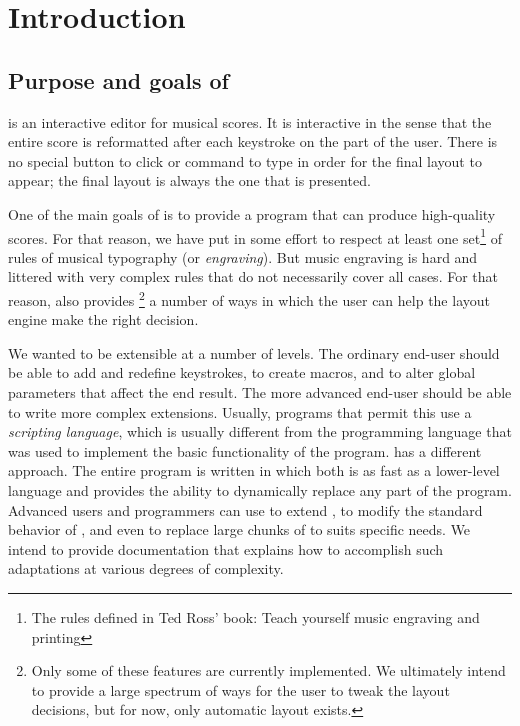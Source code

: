 \chapter{Introduction}
\setcounter{page}{1}

\section{Purpose and goals of \sysname{}}

\sysname{} is an interactive editor for musical scores.  It is interactive
in the sense that the entire score is reformatted after each keystroke
on the part of the user.  There is no special button to click or
command to type in order for the final layout to appear; the final
layout is always the one that is presented. 

One of the main goals of \sysname{} is to provide a program that can
produce high-quality scores.  For that reason, we have put in some
effort to respect at least one set\footnote{The rules defined in Ted
Ross' book: Teach yourself music engraving and printing} of rules of
musical typography (or \emph{engraving}).  But music
engraving is hard and littered with very complex rules that do not
necessarily cover all cases.  For that reason, \sysname{} also provides
\footnote{Only some of these features are currently implemented.  We
ultimately intend to provide a large spectrum of ways for the user to
tweak the layout decisions, but for now, only automatic layout
exists.} a number of ways in which the user can help the layout engine
make the right decision.

We wanted \sysname{} to be extensible at a number of levels.  The ordinary
end-user should be able to add and redefine keystrokes, to create
macros, and to alter global parameters that affect the end result.
The more advanced end-user should be able to write more complex
extensions.  Usually, programs that permit this use a \emph{scripting
language}, which is usually different from the programming language
that was used to implement the basic functionality of the program.
\sysname{} has a different approach.  The entire program is written in
{\commonlisp} which both is as fast as a lower-level language and
provides the ability to dynamically replace any part of the program.
Advanced users and programmers can use {\commonlisp} to extend \sysname{},
to modify the standard behavior of \sysname{}, and even to replace large
chunks of \sysname{} to suits specific needs.  We intend to provide
documentation that explains how to accomplish such adaptations at
various degrees of complexity.

